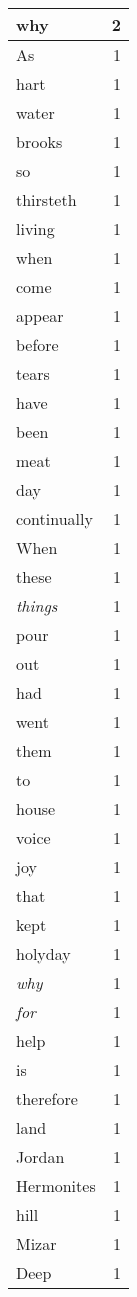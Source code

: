 \begin{center}
\begin{longtable}{l|r}
why & 2 \\ \hline
As & 1 \\ \hline
hart & 1 \\ \hline
water & 1 \\ \hline
brooks & 1 \\ \hline
so & 1 \\ \hline
thirsteth & 1 \\ \hline
living & 1 \\ \hline
when & 1 \\ \hline
come & 1 \\ \hline
appear & 1 \\ \hline
before & 1 \\ \hline
tears & 1 \\ \hline
have & 1 \\ \hline
been & 1 \\ \hline
meat & 1 \\ \hline
day & 1 \\ \hline
continually & 1 \\ \hline
When & 1 \\ \hline
these & 1 \\ \hline
\emph{things} & 1 \\ \hline
pour & 1 \\ \hline
out & 1 \\ \hline
had & 1 \\ \hline
went & 1 \\ \hline
them & 1 \\ \hline
to & 1 \\ \hline
house & 1 \\ \hline
voice & 1 \\ \hline
joy & 1 \\ \hline
that & 1 \\ \hline
kept & 1 \\ \hline
holyday & 1 \\ \hline
\emph{why} & 1 \\ \hline
\emph{for} & 1 \\ \hline
help & 1 \\ \hline
is & 1 \\ \hline
therefore & 1 \\ \hline
land & 1 \\ \hline
Jordan & 1 \\ \hline
Hermonites & 1 \\ \hline
hill & 1 \\ \hline
Mizar & 1 \\ \hline
Deep & 1 \\ \hline

\end{longtable}
\end{center}
